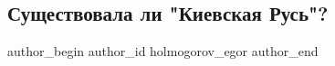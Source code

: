  
 
 
 
 
 
\subsection{Существовала ли "Киевская Русь"?}
\label{sec:17_02_2022.yz.holmogorov_egor.1.kievrus}
 
\ifcmt
 author_begin
   author_id holmogorov_egor
 author_end
\fi
